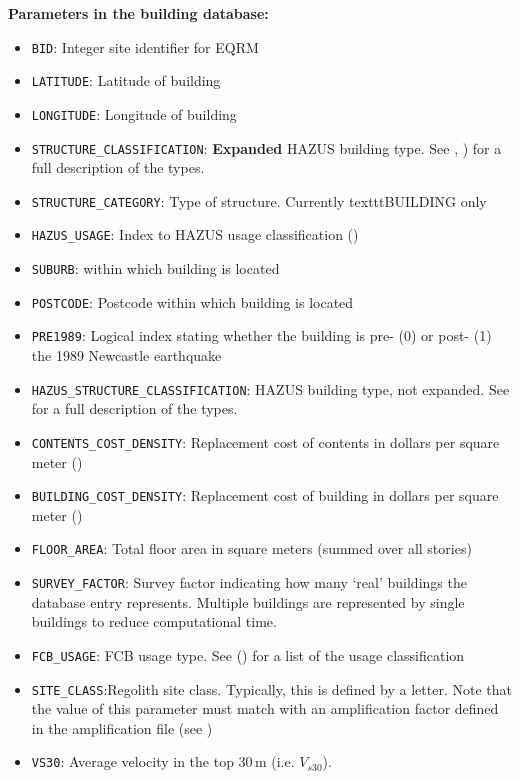 \textbf{Parameters in the building database:}
\begin{itemize}
\item \texttt{BID}: Integer site identifier for EQRM
\item \texttt{LATITUDE}: Latitude of building
\item \texttt{LONGITUDE}: Longitude of building

\item \texttt{STRUCTURE\_CLASSIFICATION}: \textbf{Expanded} HAZUS
  building type. See 
    , ) for a full
    description of the types.

\item \texttt{STRUCTURE\_CATEGORY}: Type of structure. Currently texttt{BUILDING} only
\item \texttt{HAZUS\_USAGE}: Index to HAZUS usage classification ()
\item \texttt{SUBURB}: within which building is located
\item \texttt{POSTCODE}: Postcode within which building is located
\item \texttt{PRE1989}: Logical index stating whether the building is pre- (0) or post- (1) the 1989 Newcastle earthquake
\item \texttt{HAZUS\_STRUCTURE\_CLASSIFICATION}: HAZUS building
  type, not expanded. See  for a full
  description of the types.
\item \texttt{CONTENTS\_COST\_DENSITY}: Replacement cost of contents in dollars per square meter ()
\item \texttt{BUILDING\_COST\_DENSITY}: Replacement cost of building in dollars per square meter ()
\item \texttt{FLOOR\_AREA}: Total floor area in square meters (summed over all stories)
\item \texttt{SURVEY\_FACTOR}: Survey factor indicating how many
  `real' buildings the database entry represents.  Multiple buildings
  are represented by single buildings to reduce computational time.
\item \texttt{FCB\_USAGE}: FCB usage type. See
  ()  for a list of the usage
  classification
\item \texttt{SITE\_CLASS}:Regolith site class. Typically, this is defined
by a letter. Note that the value of this parameter must match with
an amplification factor defined in the amplification file (see
)
\item \texttt{VS30}: Average velocity in the top 30\,m
  (i.e. $V_{s30}$).
\end{itemize}


